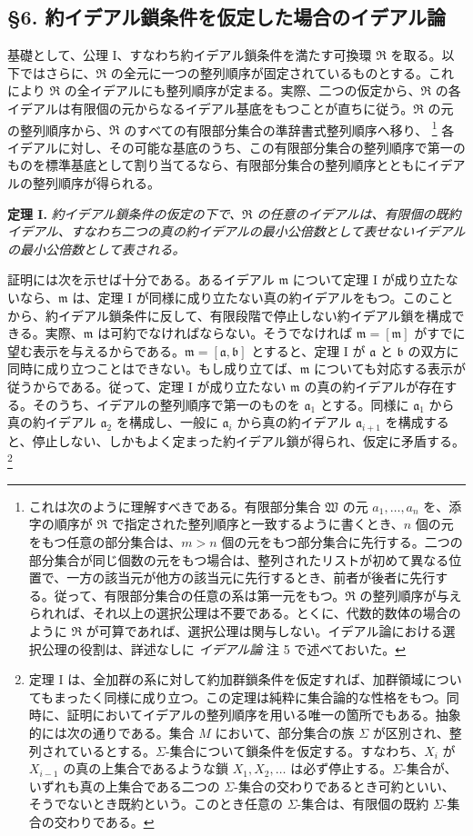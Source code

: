 \documentclass[11pt]{article}
\providecommand{\mR}{\mathfrak{R}}
\providecommand{\ma}{\mathfrak{a}}
\providecommand{\mb}{\mathfrak{b}}
\providecommand{\mm}{\mathfrak{m}}
\begin{document}
\setcounter{footnote}{25}

\subsection*{§6. 約イデアル鎖条件を仮定した場合のイデアル論}

基礎として、公理 I、すなわち約イデアル鎖条件を満たす可換環 $\mR$ を取る。以下ではさらに、$\mR$ の全元に一つの整列順序が固定されているものとする。これにより $\mR$ の全イデアルにも整列順序が定まる。実際、二つの仮定から、$\mR$ の各イデアルは有限個の元からなるイデアル基底をもつことが直ちに従う。$\mR$ の元の整列順序から、$\mR$ のすべての有限部分集合の準辞書式整列順序へ移り、
\footnote{これは次のように理解すべきである。有限部分集合 $\mathfrak W$ の元 $a_1,\ldots,a_n$ を、添字の順序が $\mR$ で指定された整列順序と一致するように書くとき、$n$ 個の元をもつ任意の部分集合は、$m>n$ 個の元をもつ部分集合に先行する。二つの部分集合が同じ個数の元をもつ場合は、整列されたリストが初めて異なる位置で、一方の該当元が他方の該当元に先行するとき、前者が後者に先行する。従って、有限部分集合の任意の系は第一元をもつ。$\mR$ の整列順序が与えられれば、それ以上の選択公理は不要である。とくに、代数的数体の場合のように $\mR$ が可算であれば、選択公理は関与しない。イデアル論における選択公理の役割は、詳述なしに \emph{イデアル論} 注 5 で述べておいた。}
各イデアルに対し、その可能な基底のうち、この有限部分集合の整列順序で第一のものを標準基底として割り当てるなら、有限部分集合の整列順序とともにイデアルの整列順序が得られる。

\textbf{定理 I.} \emph{約イデアル鎖条件の仮定の下で、$\mR$ の任意のイデアルは、有限個の既約イデアル、すなわち二つの真の約イデアルの最小公倍数として表せないイデアルの最小公倍数として表される。}

証明には次を示せば十分である。あるイデアル $\mm$ について定理 I が成り立たないなら、$\mm$ は、定理 I が同様に成り立たない真の約イデアルをもつ。このことから、約イデアル鎖条件に反して、有限段階で停止しない約イデアル鎖を構成できる。実際、$\mm$ は可約でなければならない。そうでなければ $\mm=[\mm]$ がすでに望む表示を与えるからである。$\mm=[\ma,\mb]$ とすると、定理 I が $\ma$ と $\mb$ の双方に同時に成り立つことはできない。もし成り立てば、$\mm$ についても対応する表示が従うからである。従って、定理 I が成り立たない $\mm$ の真の約イデアルが存在する。そのうち、イデアルの整列順序で第一のものを $\ma_1$ とする。同様に $\ma_1$ から真の約イデアル $\ma_2$ を構成し、一般に $\ma_i$ から真の約イデアル $\ma_{i+1}$ を構成すると、停止しない、しかもよく定まった約イデアル鎖が得られ、仮定に矛盾する。
\footnote{定理 I は、全加群の系に対して約加群鎖条件を仮定すれば、加群領域についてもまったく同様に成り立つ。この定理は純粋に集合論的な性格をもつ。同時に、証明においてイデアルの整列順序を用いる唯一の箇所でもある。抽象的には次の通りである。集合 $M$ において、部分集合の族 $\Sigma$ が区別され、整列されているとする。$\Sigma$-集合について鎖条件を仮定する。すなわち、$X_i$ が $X_{i-1}$ の真の上集合であるような鎖 $X_1,X_2,\ldots$ は必ず停止する。$\Sigma$-集合が、いずれも真の上集合である二つの $\Sigma$-集合の交わりであるとき可約といい、そうでないとき既約という。このとき任意の $\Sigma$-集合は、有限個の既約 $\Sigma$-集合の交わりである。}
\end{document}
